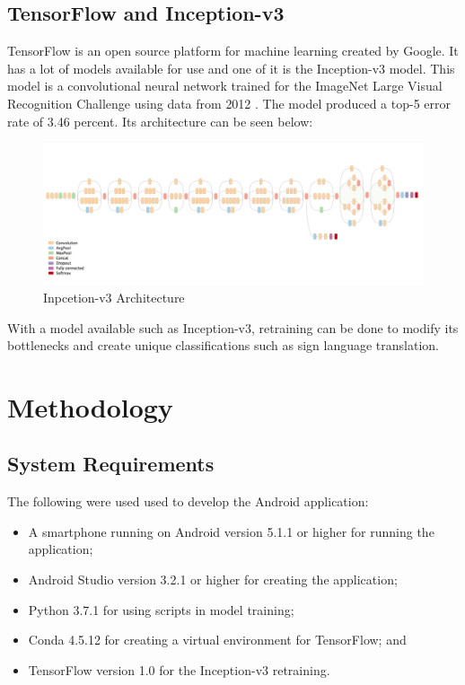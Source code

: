 \documentclass[journal]{./IEEE/IEEEtran}
\begin{document}
\subsection{TensorFlow and Inception-v3}
TensorFlow is an open source platform for machine learning created by Google. It has a lot of models available for use and one of it is the Inception-v3 model. This model is a convolutional neural network trained for the ImageNet Large Visual Recognition Challenge using data from 2012 \cite{Szegedy2014}.
\newline
\indent The model produced a top-5 error rate of 3.46 percent. Its architecture can be seen below:

\begin{figure}[ht!]
    \centering
    \includegraphics[width=1\linewidth]{./images/inception.png}
    \caption{Inpcetion-v3 Architecture}
    \label{fig:inception}
\end{figure}

\indent With a model available such as Inception-v3, retraining can be done to modify its bottlenecks and create unique classifications such as sign language translation.

\section{Methodology}

\subsection{System Requirements}
The following were used used to develop the Android application:

\begin{itemize}
    \item A smartphone running on Android version 5.1.1 or higher for running the application;
    \item Android Studio version 3.2.1 or higher for creating the application;
    \item Python 3.7.1 for using scripts in model training;
    \item Conda 4.5.12 for creating a virtual environment for TensorFlow; and
    \item TensorFlow version 1.0 for the Inception-v3 retraining.
\end{itemize}
\end{document}
